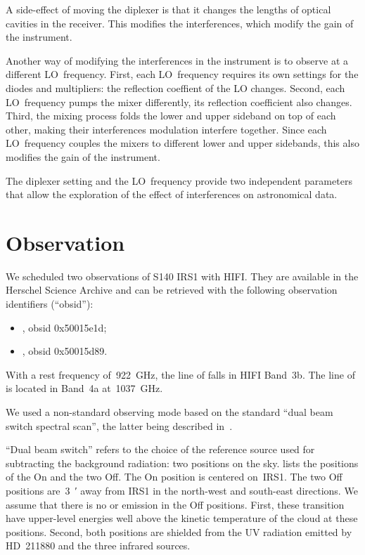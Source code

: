 A side-effect of moving the diplexer is that it changes the lengths of optical cavities in the receiver.
This modifies the interferences, which modify the gain of the instrument.

Another way of modifying the interferences in the instrument is to observe at a different LO~frequency.
First, each LO~frequency requires its own settings for the diodes and multipliers: the reflection coeffient of the LO changes.
Second, each LO~frequency pumps the mixer differently, its reflection coefficient also changes.
Third, the mixing process folds the lower and upper sideband on top of each other, making their interferences modulation interfere together.
Since each LO~frequency couples the mixers to different lower and upper sidebands, this also modifies the gain of the instrument.

The diplexer setting and the LO~frequency provide two independent parameters that allow the exploration of the effect of interferences on astronomical data.


\FloatBarrier
\section{Observation}

We scheduled two observations of S140 IRS1 with HIFI.
They are available in the Herschel Science Archive and can be retrieved with the following observation identifiers (``obsid''):
\begin{itemize}[noitemsep,nolistsep]
    \item {}, obsid 0x50015e1d;
    \item {}, obsid 0x50015d89.
\end{itemize}

With a rest frequency of~\SI{922}{\giga\hertz}, the line of  falls in HIFI Band~3b.
The line of  is located in Band~4a at~\SI{1037}{\giga\hertz}.

We used a non-standard observing mode based on the standard ``dual beam switch spectral scan'', the latter being described in~\cite{hifiobserversmanual}.

``Dual beam switch'' refers to the choice of the reference source used for subtracting the background radiation: two positions on the sky.
 lists the positions of the On and the two Off.
The On position is centered on~IRS1.
The two Off positions are~\SI{3}{\arcmin} away from IRS1 in the north-west and south-east directions.
We assume that there is no  or  emission in the Off positions.
First, these transition have upper-level energies well above the kinetic temperature of the cloud at these positions.
Second, both positions are shielded from the UV radiation emitted by HD~211880 and the three infrared sources.

